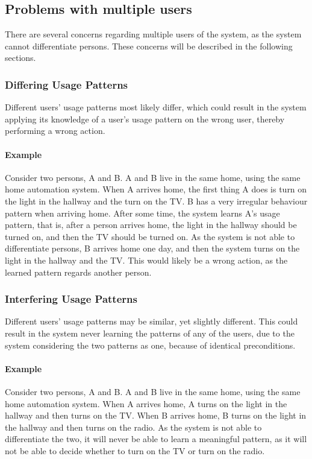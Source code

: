 \subsection{Problems with multiple users}
There are several concerns regarding multiple users of the system, as the system cannot differentiate persons. These concerns will be described in the following sections.

\subsubsection{Differing Usage Patterns}
Different users' usage patterns most likely differ, which could result in the system applying its knowledge of a user's usage pattern on the wrong user, thereby performing a wrong action.
\paragraph{Example}
Consider two persons, A and B. A and B live in the same home, using the same home automation system. When A arrives home, the first thing A does is turn on the light in the hallway and the turn on the TV. B has a very irregular behaviour pattern when arriving home. After some time, the system learns A's usage pattern, that is, after a person arrives home, the light in the hallway should be turned on, and then the TV should be turned on. As the system is not able to differentiate persons, B arrives home one day, and then the system turns on the light in the hallway and the TV. This would likely be a wrong action, as the learned pattern regards another person.
\subsubsection{Interfering Usage Patterns}
Different users' usage patterns may be similar, yet slightly different. This could result in the system never learning the patterns of any of the users, due to the system considering the two patterns as one, because of identical preconditions.
\paragraph{Example}
Consider two persons, A and B. A and B live in the same home, using the same home automation system. When A arrives home, A turns on the light in the hallway and then turns on the TV. When B arrives home, B turns on the light in the hallway and then turns on the radio. As the system is not able to differentiate the two, it will never be able to learn a meaningful pattern, as it will not be able to decide whether to turn on the TV or turn on the radio.
